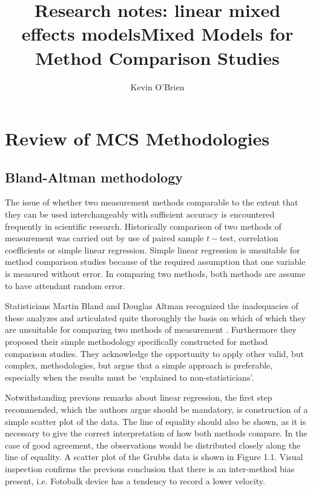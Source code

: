 \documentclass[12pt, a4paper]{report}
\title{Research notes: linear mixed effects models}
\author{ } \date{ }
\theoremstyle{plain}
\theoremstyle{definition}
\theoremstyle{remark}
\begin{document}
	\author{Kevin O'Brien}
	\title{Mixed Models for Method Comparison Studies}
	\tableofcontents
	\chapter{Review of MCS Methodologies}
	\section{Bland-Altman methodology}
	The issue of whether two measurement methods comparable to the 	extent that they can be used interchangeably with sufficient
	accuracy is encountered frequently in scientific research.
	Historically comparison of two methods of measurement was carried 	out by use of paired sample $t-$test, correlation coefficients or
	simple linear regression. Simple linear regression is unsuitable for method comparison studies because of the required assumption that one variable is measured without error. In comparing two methods, both methods are assume to have attendant random error.
	
	Statisticians Martin Bland and Douglas Altman recognized the inadequacies of these analyzes and
	articulated quite thoroughly the basis on which of which they are unsuitable for comparing two methods of measurement \citep*{BA83}. Furthermore they proposed their simple methodology specifically constructed for method comparison studies. They acknowledge the opportunity to apply other valid, but complex, methodologies, but argue that a simple approach is preferable, especially when the
	results must be `explained to non-statisticians'.
	
	Notwithstanding previous remarks about linear regression, the first step recommended, which the authors argue should be mandatory, is construction of a simple scatter plot of the data. The line of equality should also be shown, as it is necessary to give the correct interpretation of how both methods compare. In the case of good agreement, the observations would be distributed closely along the line of equality. A scatter plot of the Grubbs data is shown in Figure 1.1. Visual inspection confirms the previous conclusion that there is an inter-method bias present, i.e. Fotobalk device has a tendency to record a lower velocity.
	
\end{document}
